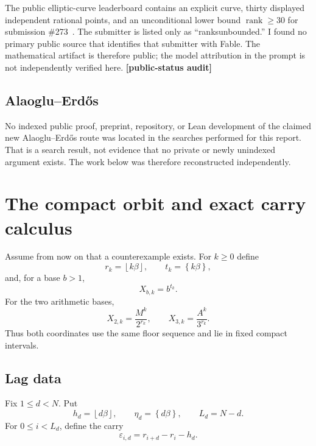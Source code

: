 \documentclass[11pt,oneside]{article}
\theoremstyle{definition}
\theoremstyle{remark}
\newcommand{\floor}[1]{\left\lfloor #1\right\rfloor}
\newcommand{\fract}[1]{\left\{#1\right\}}
\newcommand{\statusaudit}{\textcolor{amber}{\textbf{[public-status audit]}}}
\begin{document}
The public elliptic-curve leaderboard contains an explicit curve, thirty displayed independent
rational points, and an unconditional lower bound $\operatorname{rank}\ge30$ for submission
\#273~\cite{RankThirty}.  The submitter is listed only as ``ranksunbounded.''  I found no
primary public source that identifies that submitter with Fable.  The mathematical artifact is
therefore public; the model attribution in the prompt is not independently verified here.
\statusaudit

\subsection{Alaoglu--Erd\H{o}s}

No indexed public proof, preprint, repository, or Lean development of the claimed new
Alaoglu--Erd\H{o}s route was located in the searches performed for this report.  That is a
search result, not evidence that no private or newly unindexed argument exists.  The work below
was therefore reconstructed independently.

\section{The compact orbit and exact carry calculus}
\label{sec:orbit}

Assume from now on that a counterexample exists.  For $k\ge0$ define
\begin{equation}
 r_k=\floor{k\beta},\qquad t_k=\fract{k\beta},
 \label{eq:rt}
\end{equation}
and, for a base $b>1$,
\begin{equation}
 X_{b,k}=b^{t_k}.
 \label{eq:Xbk}
\end{equation}
For the two arithmetic bases,
\begin{equation}
 X_{2,k}=\frac{M^k}{2^{r_k}},\qquad
 X_{3,k}=\frac{A^k}{3^{r_k}}.
 \label{eq:compact-orbit}
\end{equation}
Thus both coordinates use the same floor sequence and lie in fixed compact intervals.

\subsection{Lag data}

Fix $1\le d<N$.  Put
\begin{equation}
 h_d=\floor{d\beta},\qquad \eta_d=\fract{d\beta},\qquad L_d=N-d.
 \label{eq:lag-data}
\end{equation}
For $0\le i<L_d$, define the carry
\begin{equation}
 \varepsilon_{i,d}=r_{i+d}-r_i-h_d.
 \label{eq:carry}
\end{equation}
\end{document}
